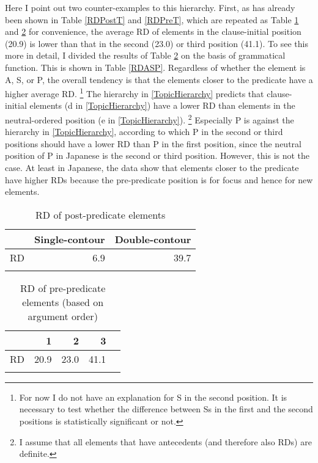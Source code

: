 Here I point out two counter-examples to this hierarchy.
First,
as has already been shown in Table \ref{RDPostT} and \ref{RDPreT},
which are repeated as Table \ref{RDPostT2} and \ref{RDPreT2} for convenience,
the average RD of elements in the clause-initial position (20.9) is lower than that in the second (23.0) or third position (41.1).
To see this more in detail,
I divided the results of Table \ref{RDPreT2} on the basis of grammatical function.
This is shown in Table \ref{RDASP}.
Regardless of whether the element is A, S, or P,
the overall tendency is that
the elements closer to the predicate have a higher average RD.%
 \footnote{
 For now I do not have an explanation for S in the second position.
 It is necessary to test whether the difference between Ss in the first and the second positions is statistically significant or not.
 }
The  hierarchy in \ref{TopicHierarchy} predicts that
clause-initial elements (d in \ref{TopicHierarchy}) have a lower RD than elements in the neutral-ordered position (e in \ref{TopicHierarchy}).%
	\footnote{
	I assume that all elements that have antecedents (and therefore also RDs) are definite.
	}
Especially P is against the  hierarchy in \ref{TopicHierarchy},
according to which P in the second or third positions should have a lower RD than P in the first position, since the neutral position of P in Japanese is the second or third position.
However, this is not the case.
At least in Japanese,
the data show that
elements closer to the predicate have higher RDs because the pre-predicate position is for focus and hence for new elements.

\begin{table}[bht]
\centering
\caption{RD of post-predicate elements}
\begin{tabular}{lrr}
\lsptoprule
  & Single-contour & Double-contour \\
\midrule
RD & 6.9 & 39.7 \\
\lspbottomrule
\end{tabular}
\label{RDPostT2}
\end{table}
\begin{table}
\centering
\caption{RD of pre-predicate elements (based on argument order)}
\begin{tabular}{lrrrr}
\lsptoprule
  &  1  & 2 & 3 \\
\midrule
RD & 20.9 & 23.0 & 41.1 \\
\lspbottomrule
\end{tabular}
\label{RDPreT2}
\end{table}

